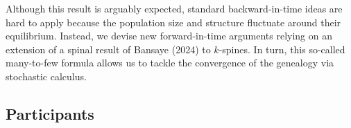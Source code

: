 \documentclass[12pt,a4paper]{article}
\begin{document}
 Although this result is arguably expected, standard backward-in-time ideas are hard to apply because the population size and structure fluctuate around their equilibrium. Instead, we devise new forward-in-time arguments relying on an extension of a spinal result of Bansaye (2024) to $k$-spines. In turn, this so-called many-to-few formula allows us to tackle the convergence of the genealogy via stochastic calculus. 

\bigskip\bigskip

\newpage

\vfill
\vfill

\newpage
 
\subsection*{Participants}
\end{document}
